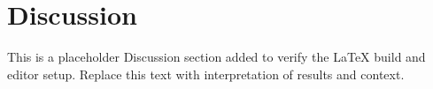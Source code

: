 \section{Discussion}

This is a placeholder Discussion section added to verify the LaTeX build and
editor setup. Replace this text with interpretation of results and context.

